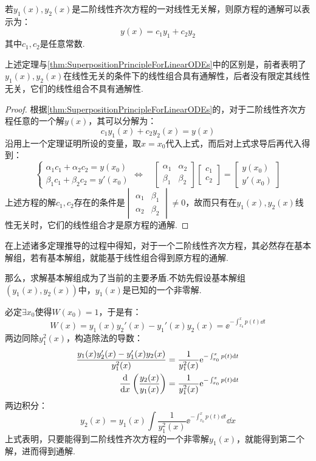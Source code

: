 \begin{theorem}
    若$y_1(x),y_2(x)$是二阶线性齐次方程的一对线性无关解，则原方程的通解可以表示为：
    \[y(x) = c_1 y_1 + c_2 y_2\]
    其中$c_1,c_2$是任意常数.
\end{theorem}

上述定理与\cref{thm:SuperpositionPrincipleForLinearODEs}中的区别是，前者表明了$y_1(x),y_2(x)$在线性无关的条件下的线性组合具有通解性，后者没有限定其线性无关，它们的线性组合不具有通解性.

\begin{proof}
    根据\cref{thm:SuperpositionPrincipleForLinearODEs}的，对于二阶线性齐次方程任意的一个解$y(x)$，其可以分解为：
    \[c_1 y_1(x) + c_2 y_2(x) = y(x)\]
    沿用上一个定理证明所设的变量，取$x=x_0$代入上式，而后对上式求导后再代入得到：
    \[\begin{cases}
        \alpha_1 c_1 + \alpha_2 c_2 = y(x_0) \\
        \beta_1 c_1 + \beta_2 c_2 = y'(x_0)
    \end{cases} \Leftrightarrow\quad \begin{bmatrix}
        \alpha_1 & \alpha_2 \\
        \beta_1 & \beta_2
    \end{bmatrix} \begin{bmatrix}
        c_1 \\ c_2
    \end{bmatrix} = \begin{bmatrix}
        y(x_0) \\ y'(x_0)
    \end{bmatrix}\]
    上述方程的解$c_1,c_2$存在的条件是$\begin{vmatrix}
        \alpha_1 & \beta_1 \\
        \alpha_2 & \beta_2
    \end{vmatrix} \neq 0$，故而只有在$y_1(x),y_2(x)$线性无关时，它们的线性组合才是原方程的通解.
\end{proof}

在上述诸多定理推导的过程中得知，对于一个二阶线性齐次方程，其必然存在基本解组，若有基本解组，就能基于线性组合得到原方程的通解.

那么，求解基本解组成为了当前的主要矛盾.不妨先假设基本解组$(y_1(x),y_2(x))$中，$y_1(x)$是已知的一个非零解.

必定$\exists x_0$使得$W(x_0) = 1$，于是有：
\[W(x) = y_1(x)y_2'(x) - y_1'(x)y_2(x) = \ee^{-\int_{x_0}^{x}p(t)\dd{t}}\]
两边同除$y_1^2(x)$，构造除法的导数：
\begin{align*}
    \frac{y_1(x)y_2'(x) - y_1'(x)y_2(x)}{y_1^2(x)} &= \frac{1}{y_1^2(x)}\mathrm{e}^{-\int_{x_0}^{x}p(t)\dd{t}}\\
    \dv{x}\left(\frac{y_2(x)}{y_1(x)}\right) &= \frac{1}{y_1^2(x)}\mathrm{e}^{-\int_{x_0}^{x}p(t)\dd{t}}
\end{align*}
两边积分：
\[y_2(x) = y_1(x)\int\frac{1}{y_1^2(x)}\ee^{-\int_{x_0}^{x}p(t)\dd{t}}\dd{x}\]
上式表明，只要能得到二阶线性齐次方程的一个非零解$y_1(x)$，就能得到第二个解，进而得到通解.

